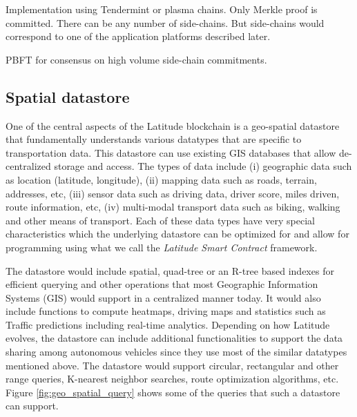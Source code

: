 Implementation using Tendermint or plasma chains. Only Merkle proof is
committed. There can be any number of side-chains. But side-chains would correspond to one of the application platforms
described later.

PBFT for consensus on high volume side-chain commitments.

\subsection{Spatial datastore}
One of the central aspects of the Latitude blockchain is a geo-spatial datastore that fundamentally understands various
datatypes that are specific to transportation data. This datastore can use existing GIS databases that allow
de-centralized storage and access. The types of data include (i) geographic data such as location (latitude, longitude),
(ii) mapping data such as roads, terrain, addresses, etc, (iii) sensor data such as driving data, driver score, miles
driven, route information, etc, (iv) multi-modal transport data such as biking, walking and other means of transport.
Each of these data types have very special characteristics which the underlying datastore can be optimized for and allow
for programming using what we call the {\em Latitude Smart Contract} framework. 

The datastore would include spatial, quad-tree or an R-tree based indexes for efficient querying and other operations that
most Geographic Information Systems (GIS) would support in a centralized manner today. It would also include functions
to compute heatmaps, driving maps and statistics such as Traffic predictions including real-time analytics. Depending on
how Latitude evolves, the datastore can include additional functionalities to support the data sharing among autonomous
vehicles since they use most of the similar datatypes mentioned above. The datastore would support circular, rectangular
and other range queries, K-nearest neighbor searches, route optimization algorithms, etc. Figure
\ref{fig:geo_spatial_query} shows some of the queries that such a datastore can support.


